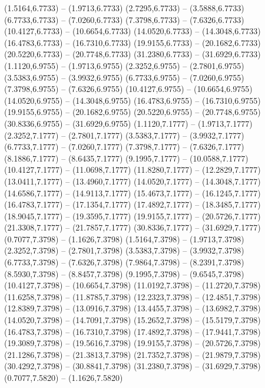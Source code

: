 {\begin{scope}[shift={(#1,#2)}]
    (1.5164,6.7733) -- (1.9713,6.7733)
    (2.7295,6.7733) -- (3.5888,6.7733)
    (6.7733,6.7733) -- (7.0260,6.7733)
    (7.3798,6.7733) -- (7.6326,6.7733)
    (10.4127,6.7733) -- (10.6654,6.7733)
    (14.0520,6.7733) -- (14.3048,6.7733)
    (16.4783,6.7733) -- (16.7310,6.7733)
    (19.9155,6.7733) -- (20.1682,6.7733)
    (20.5220,6.7733) -- (20.7748,6.7733)
    (31.2380,6.7733) -- (31.6929,6.7733)
    (1.1120,6.9755) -- (1.9713,6.9755)
    (2.3252,6.9755) -- (2.7801,6.9755)
    (3.5383,6.9755) -- (3.9932,6.9755)
    (6.7733,6.9755) -- (7.0260,6.9755)
    (7.3798,6.9755) -- (7.6326,6.9755)
    (10.4127,6.9755) -- (10.6654,6.9755)
    (14.0520,6.9755) -- (14.3048,6.9755)
    (16.4783,6.9755) -- (16.7310,6.9755)
    (19.9155,6.9755) -- (20.1682,6.9755)
    (20.5220,6.9755) -- (20.7748,6.9755)
    (30.8336,6.9755) -- (31.6929,6.9755)
    (1.1120,7.1777) -- (1.9713,7.1777)
    (2.3252,7.1777) -- (2.7801,7.1777)
    (3.5383,7.1777) -- (3.9932,7.1777)
    (6.7733,7.1777) -- (7.0260,7.1777)
    (7.3798,7.1777) -- (7.6326,7.1777)
    (8.1886,7.1777) -- (8.6435,7.1777)
    (9.1995,7.1777) -- (10.0588,7.1777)
    (10.4127,7.1777) -- (11.0698,7.1777)
    (11.8280,7.1777) -- (12.2829,7.1777)
    (13.0411,7.1777) -- (13.4960,7.1777)
    (14.0520,7.1777) -- (14.3048,7.1777)
    (14.6586,7.1777) -- (14.9113,7.1777)
    (15.4673,7.1777) -- (16.1245,7.1777)
    (16.4783,7.1777) -- (17.1354,7.1777)
    (17.4892,7.1777) -- (18.3485,7.1777)
    (18.9045,7.1777) -- (19.3595,7.1777)
    (19.9155,7.1777) -- (20.5726,7.1777)
    (21.3308,7.1777) -- (21.7857,7.1777)
    (30.8336,7.1777) -- (31.6929,7.1777)
    (0.7077,7.3798) -- (1.1626,7.3798)
    (1.5164,7.3798) -- (1.9713,7.3798)
    (2.3252,7.3798) -- (2.7801,7.3798)
    (3.5383,7.3798) -- (3.9932,7.3798)
    (6.7733,7.3798) -- (7.6326,7.3798)
    (7.9864,7.3798) -- (8.2391,7.3798)
    (8.5930,7.3798) -- (8.8457,7.3798)
    (9.1995,7.3798) -- (9.6545,7.3798)
    (10.4127,7.3798) -- (10.6654,7.3798)
    (11.0192,7.3798) -- (11.2720,7.3798)
    (11.6258,7.3798) -- (11.8785,7.3798)
    (12.2323,7.3798) -- (12.4851,7.3798)
    (12.8389,7.3798) -- (13.0916,7.3798)
    (13.4455,7.3798) -- (13.6982,7.3798)
    (14.0520,7.3798) -- (14.7091,7.3798)
    (15.2652,7.3798) -- (15.5179,7.3798)
    (16.4783,7.3798) -- (16.7310,7.3798)
    (17.4892,7.3798) -- (17.9441,7.3798)
    (19.3089,7.3798) -- (19.5616,7.3798)
    (19.9155,7.3798) -- (20.5726,7.3798)
    (21.1286,7.3798) -- (21.3813,7.3798)
    (21.7352,7.3798) -- (21.9879,7.3798)
    (30.4292,7.3798) -- (30.8841,7.3798)
    (31.2380,7.3798) -- (31.6929,7.3798)
    (0.7077,7.5820) -- (1.1626,7.5820)

\end{scope}}
